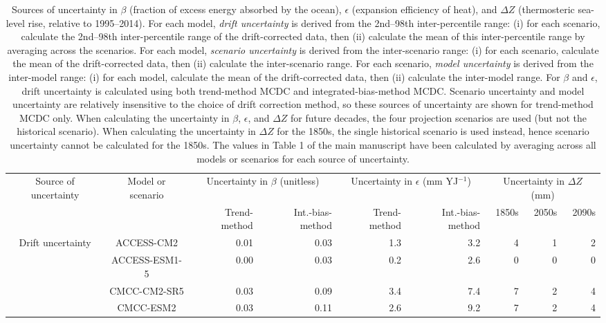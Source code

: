 \begin{table*}[t]
\centering
\caption{Sources of uncertainty in $\beta$ (fraction of excess energy absorbed by the ocean), $\epsilon$ (expansion efficiency of heat), and ${\Delta}Z$ (thermosteric sea-level rise, relative to 1995--2014). For each model, \emph{drift uncertainty} is derived from the 2nd--98th inter-percentile range: (i) for each scenario, calculate the 2nd--98th inter-percentile range of the drift-corrected data, then (ii) calculate the mean of this inter-percentile range by averaging across the scenarios. For each model, \emph{scenario uncertainty} is derived from the inter-scenario range: (i) for each scenario, calculate the mean of the drift-corrected data, then (ii) calculate the inter-scenario range. For each scenario, \emph{model uncertainty} is derived from the inter-model range: (i) for each model, calculate the mean of the drift-corrected data, then (ii) calculate the inter-model range. For $\beta$ and $\epsilon$, drift uncertainty is calculated using both trend-method MCDC and integrated-bias-method MCDC. Scenario uncertainty and model uncertainty are relatively insensitive to the choice of drift correction method, so these sources of uncertainty are shown for trend-method MCDC only. When calculating the uncertainty in $\beta$, $\epsilon$, and ${\Delta}Z$ for future decades, the four projection scenarios are used (but not the historical scenario). When calculating the uncertainty in ${\Delta}Z$ for the 1850s, the single historical scenario is used instead, hence scenario uncertainty cannot be calculated for the 1850s. The values in Table 1 of the main manuscript have been calculated by averaging across all models or scenarios for each source of uncertainty.}
\begin{tabular}{c|c|rr|rr|rrr}
\toprule
Source of uncertainty & Model or scenario & \multicolumn{2}{c|}{Uncertainty in $\beta$ (unitless)} & \multicolumn{2}{c|}{Uncertainty in $\epsilon$ (mm YJ$^{-1}$)} & \multicolumn{3}{c}{Uncertainty in ${\Delta}Z$ (mm)} \\
 &  & Trend-method & Int.-bias-method & Trend-method & Int.-bias-method & 1850s & 2050s & 2090s \\
\midrule
\multirow[c]{16}{*}{Drift uncertainty} & ACCESS-CM2 & 0.01 & 0.03 & 1.3 & 3.2 & 4 & 1 & 2 \\
 & ACCESS-ESM1-5 & 0.00 & 0.03 & 0.2 & 2.6 & 0 & 0 & 0 \\
 & CMCC-CM2-SR5 & 0.03 & 0.09 & 3.4 & 7.4 & 7 & 2 & 4 \\
 & CMCC-ESM2 & 0.03 & 0.11 & 2.6 & 9.2 & 7 & 2 & 4 \\

\end{tabular}
\end{table*}
